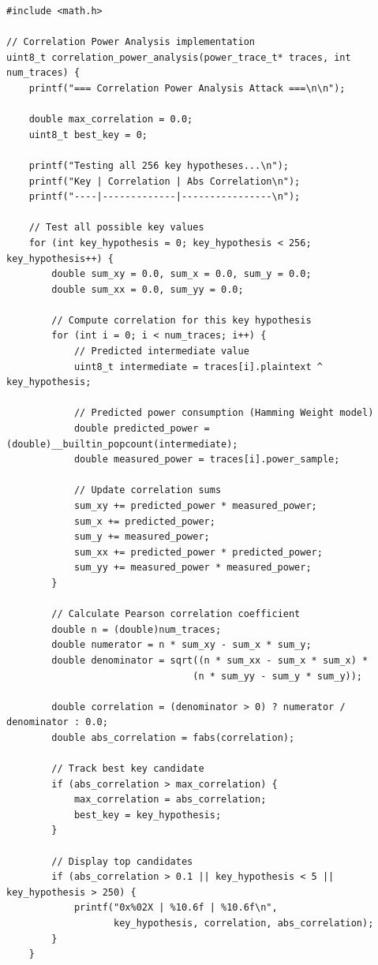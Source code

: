 \documentclass[11pt,a4paper]{article}
\theoremstyle{definition}
\begin{document}
\begin{lstlisting}[caption={Complete Power Analysis Attack Implementation}]
#include <math.h>

// Correlation Power Analysis implementation
uint8_t correlation_power_analysis(power_trace_t* traces, int num_traces) {
    printf("=== Correlation Power Analysis Attack ===\n\n");
    
    double max_correlation = 0.0;
    uint8_t best_key = 0;
    
    printf("Testing all 256 key hypotheses...\n");
    printf("Key | Correlation | Abs Correlation\n");
    printf("----|-------------|----------------\n");
    
    // Test all possible key values
    for (int key_hypothesis = 0; key_hypothesis < 256; key_hypothesis++) {
        double sum_xy = 0.0, sum_x = 0.0, sum_y = 0.0;
        double sum_xx = 0.0, sum_yy = 0.0;
        
        // Compute correlation for this key hypothesis
        for (int i = 0; i < num_traces; i++) {
            // Predicted intermediate value
            uint8_t intermediate = traces[i].plaintext ^ key_hypothesis;
            
            // Predicted power consumption (Hamming Weight model)
            double predicted_power = (double)__builtin_popcount(intermediate);
            double measured_power = traces[i].power_sample;
            
            // Update correlation sums
            sum_xy += predicted_power * measured_power;
            sum_x += predicted_power;
            sum_y += measured_power;
            sum_xx += predicted_power * predicted_power;
            sum_yy += measured_power * measured_power;
        }
        
        // Calculate Pearson correlation coefficient
        double n = (double)num_traces;
        double numerator = n * sum_xy - sum_x * sum_y;
        double denominator = sqrt((n * sum_xx - sum_x * sum_x) * 
                                 (n * sum_yy - sum_y * sum_y));
        
        double correlation = (denominator > 0) ? numerator / denominator : 0.0;
        double abs_correlation = fabs(correlation);
        
        // Track best key candidate
        if (abs_correlation > max_correlation) {
            max_correlation = abs_correlation;
            best_key = key_hypothesis;
        }
        
        // Display top candidates
        if (abs_correlation > 0.1 || key_hypothesis < 5 || key_hypothesis > 250) {
            printf("0x%02X | %10.6f | %10.6f\n", 
                   key_hypothesis, correlation, abs_correlation);
        }
    }
    

\end{lstlisting}
\end{document}
